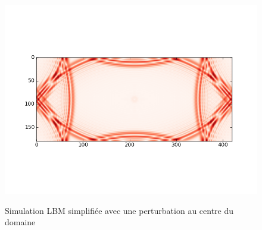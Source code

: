 \begin{figure}[h]
{		\includegraphics[scale=0.55, trim=45 90 50 90, clip]{images/lbm_simple/lbm_500.png}
		\label{fig:lbm_simple_500}
	}
	\caption{Simulation \ac{LBM} simplifiée avec une perturbation au centre du domaine}
	\label{fig:lbm_simple}
\end{figure}

